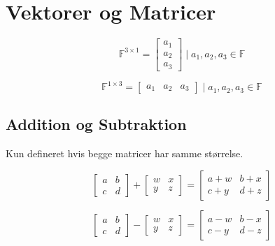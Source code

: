 \section{Vektorer og Matricer}
\begin{minipage}{0.35\textwidth}
    \[
        \mathbb{F}^{3 \times 1} =
            \begin{bmatrix}
                a_{1} \\
                a_{2} \\
                a_{3}
                \end{bmatrix}
            \mid a_{1}, a_{2}, a_{3} \in \mathbb{F}
    \]
\end{minipage}
\hfill
\begin{minipage}{0.55\textwidth}
    \[
        \mathbb{F}^{1 \times 3} =
            \begin{bmatrix}
                a_{1} & a_{2} & a_{3}
            \end{bmatrix}
            \mid a_{1}, a_{2}, a_{3} \in \mathbb{F}
    \]
\end{minipage}


\subsection{Addition og Subtraktion}
Kun defineret hvis begge matricer har samme størrelse.

\[
    \begin{bmatrix}
        a & b \\
        c & d
    \end{bmatrix}
    +
    \begin{bmatrix}
        w & x \\
        y & z
    \end{bmatrix}
    =
    \begin{bmatrix}
        a + w & b + x \\
        c + y & d + z
    \end{bmatrix}
\]

\[
    \begin{bmatrix}
        a & b \\
        c & d
    \end{bmatrix}
    -
    \begin{bmatrix}
        w & x \\
        y & z
    \end{bmatrix}
    =
    \begin{bmatrix}
        a - w & b - x \\
        c - y & d - z
    \end{bmatrix}
\]

